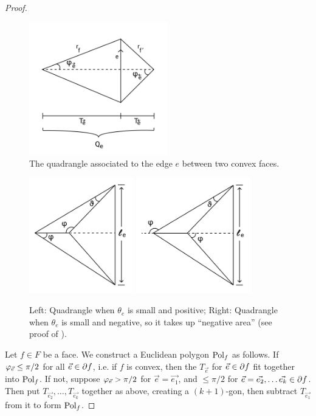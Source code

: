 \begin{proof}
\begin{figure}
\includegraphics[width=6cm]{more_pictures/kite.png}
	\caption{The quadrangle associated to the edge $e$ between two
		convex faces.}
\end{figure}
\begin{figure}
\includegraphics[height=5cm]{more_pictures/positive_angle.png}
\includegraphics[height=5cm]{more_pictures/negative_angle.png}
	\caption{Left: Quadrangle when $\theta_e$ is small and positive;
		Right: Quadrangle when $\theta_e$ is small and negative,
		so it takes up ``negative area'' (see proof of
		).}
\end{figure}


Let $f \in F$ be a face.
We construct a Euclidean polygon ${\text{Pol}}_f$ as follows.
If $\varphi_{\vec{e}} \leq \pi/2$ for all $\vec{e} \in \partial f$,
i.e. if $f$ is convex, then 
the $T_{\vec{e}}$ for $\vec{e}\in \partial f$
fit together into ${\text{Pol}}_f$.
If not, suppose $\varphi_{\vec{e}} > \pi/2$
for $\vec{e} = \vec{e_1}$, 
and $\leq \pi/2$ for $\vec{e} = \vec{e_2},\ldots \vec{e_k} \in \partial f$.
Then put $T_{\vec{e_2}},\ldots,T_{\vec{e_k}}$ together as above,
creating a $(k+1)$-gon,
then subtract $T_{\vec{e_1}}$ from it to form ${\text{Pol}}_f$.


\end{proof}
